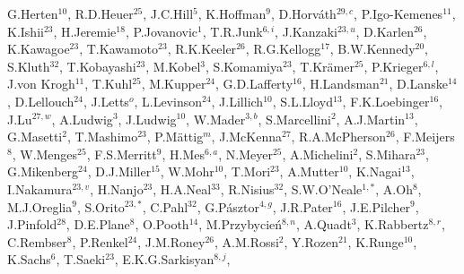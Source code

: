\documentclass[12pt,a4paper,twoside]{article}
\begin{document}
\begin{center}
{G.\thinspace Herten$^{ 10}$,
R.D.\thinspace Heuer$^{ 25}$,
J.C.\thinspace Hill$^{  5}$,
K.\thinspace Hoffman$^{  9}$,
D.\thinspace Horv\'ath$^{ 29,  c}$,
P.\thinspace Igo-Kemenes$^{ 11}$,
K.\thinspace Ishii$^{ 23}$,
H.\thinspace Jeremie$^{ 18}$,
P.\thinspace Jovanovic$^{  1}$,
T.R.\thinspace Junk$^{  6,  i}$,
J.\thinspace Kanzaki$^{ 23,  u}$,
D.\thinspace Karlen$^{ 26}$,
K.\thinspace Kawagoe$^{ 23}$,
T.\thinspace Kawamoto$^{ 23}$,
R.K.\thinspace Keeler$^{ 26}$,
R.G.\thinspace Kellogg$^{ 17}$,
B.W.\thinspace Kennedy$^{ 20}$,
S.\thinspace Kluth$^{ 32}$,
T.\thinspace Kobayashi$^{ 23}$,
M.\thinspace Kobel$^{  3}$,
S.\thinspace Komamiya$^{ 23}$,
T.\thinspace Kr\"amer$^{ 25}$,
P.\thinspace Krieger$^{  6,  l}$,
J.\thinspace von Krogh$^{ 11}$,
T.\thinspace Kuhl$^{  25}$,
M.\thinspace Kupper$^{ 24}$,
G.D.\thinspace Lafferty$^{ 16}$,
H.\thinspace Landsman$^{ 21}$,
D.\thinspace Lanske$^{ 14}$,
D.\thinspace Lellouch$^{ 24}$,
J.\thinspace Letts$^{  o}$,
L.\thinspace Levinson$^{ 24}$,
J.\thinspace Lillich$^{ 10}$,
S.L.\thinspace Lloyd$^{ 13}$,
F.K.\thinspace Loebinger$^{ 16}$,
J.\thinspace Lu$^{ 27,  w}$,
A.\thinspace Ludwig$^{  3}$,
J.\thinspace Ludwig$^{ 10}$,
W.\thinspace Mader$^{  3,  b}$,
S.\thinspace Marcellini$^{  2}$,
A.J.\thinspace Martin$^{ 13}$,
G.\thinspace Masetti$^{  2}$,
T.\thinspace Mashimo$^{ 23}$,
P.\thinspace M\"attig$^{  m}$,
J.\thinspace McKenna$^{ 27}$,
R.A.\thinspace McPherson$^{ 26}$,
F.\thinspace Meijers$^{  8}$,
W.\thinspace Menges$^{ 25}$,
F.S.\thinspace Merritt$^{  9}$,
H.\thinspace Mes$^{  6,  a}$,
N.\thinspace Meyer$^{ 25}$,
A.\thinspace Michelini$^{  2}$,
S.\thinspace Mihara$^{ 23}$,
G.\thinspace Mikenberg$^{ 24}$,
D.J.\thinspace Miller$^{ 15}$,
W.\thinspace Mohr$^{ 10}$,
T.\thinspace Mori$^{ 23}$,
A.\thinspace Mutter$^{ 10}$,
K.\thinspace Nagai$^{ 13}$,
I.\thinspace Nakamura$^{ 23,  v}$,
H.\thinspace Nanjo$^{ 23}$,
H.A.\thinspace Neal$^{ 33}$,
R.\thinspace Nisius$^{ 32}$,
S.W.\thinspace O'Neale$^{  1,  *}$,
A.\thinspace Oh$^{  8}$,
M.J.\thinspace Oreglia$^{  9}$,
S.\thinspace Orito$^{ 23,  *}$,
C.\thinspace Pahl$^{ 32}$,
G.\thinspace P\'asztor$^{  4, g}$,
J.R.\thinspace Pater$^{ 16}$,
J.E.\thinspace Pilcher$^{  9}$,
J.\thinspace Pinfold$^{ 28}$,
D.E.\thinspace Plane$^{  8}$,
O.\thinspace Pooth$^{ 14}$,
M.\thinspace Przybycie\'n$^{  8,  n}$,
A.\thinspace Quadt$^{  3}$,
K.\thinspace Rabbertz$^{  8,  r}$,
C.\thinspace Rembser$^{  8}$,
P.\thinspace Renkel$^{ 24}$,
J.M.\thinspace Roney$^{ 26}$,
A.M.\thinspace Rossi$^{  2}$,
Y.\thinspace Rozen$^{ 21}$,
K.\thinspace Runge$^{ 10}$,
K.\thinspace Sachs$^{  6}$,
T.\thinspace Saeki$^{ 23}$,
E.K.G.\thinspace Sarkisyan$^{  8,  j}$,
}
\end{center}
\end{document}
